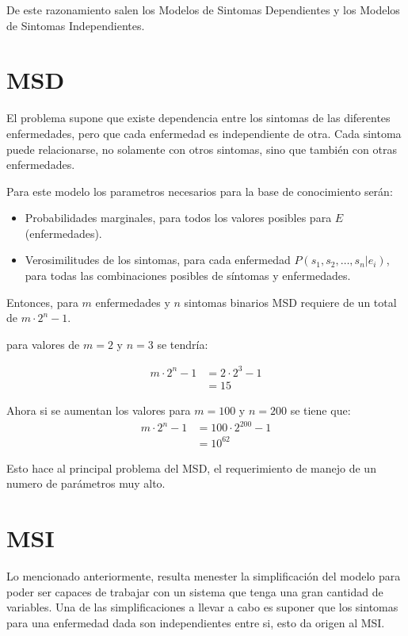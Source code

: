 \documentclass{article}
\begin{document}
De este razonamiento salen los Modelos de Sintomas Dependientes y los Modelos
de Sintomas Independientes.

\section{MSD}
El problema supone que existe dependencia entre los sintomas de las diferentes
enfermedades, pero que cada enfermedad es independiente de otra. Cada sintoma
puede relacionarse, no solamente con otros sintomas, sino que también con otras
enfermedades.

Para este modelo los parametros necesarios para la base de conocimiento serán:
\begin{itemize}
	\item Probabilidades marginales, para todos los valores posibles para $E$
		(enfermedades).
	\item Verosimilitudes de los sintomas, para cada enfermedad $P(s_{1}, s_{2},
		\hdots , s_{n} | e_{i})$, para todas las combinaciones posibles de síntomas y
		enfermedades.
\end{itemize}

Entonces, para $m$ enfermedades y $n$ sintomas binarios MSD requiere de un
total de $m \cdot 2^{n}-1$.

para valores de $m=2$ y $n=3$ se tendría:

\begin{equation}
	\begin{split}
		m \cdot 2^{n}-1 &= 2 \cdot 2^{3} - 1 \\
		&= 15
	\end{split}
\end{equation}

Ahora si se aumentan los valores para $m=100$ y $n=200$ se tiene que:
\begin{equation} \label{eq2}
	\begin{split}
		m \cdot 2^{n}-1 &= 100 \cdot 2^{200} - 1 \\
		&= 10^{62}
	\end{split}
\end{equation}

Esto hace al principal problema del MSD, el requerimiento de manejo de un
numero de parámetros muy alto.

\section{MSI}
Lo mencionado anteriormente, resulta menester la simplificación del modelo para
poder ser capaces de trabajar con un sistema que tenga una gran cantidad de
variables. Una de las simplificaciones a llevar a cabo es suponer que los
sintomas para una enfermedad dada son independientes entre si, esto da origen
al MSI.
\end{document}
